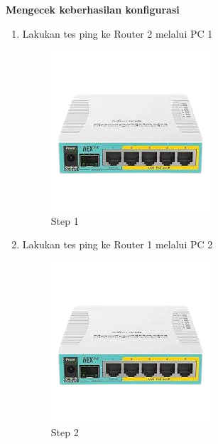 \begin{center} 
	\textbf{Mengecek keberhasilan konfigurasi}
\end{center}

\begin{enumerate}
	\item Lakukan tes ping ke Router 2 melalui PC 1
	\begin{figure}[H]
		\centering
		\includegraphics[width=0.5\linewidth]{P1/img/contoh.png}
		\caption{Step 1}
		\label{fig:gambar8}
	\end{figure}

	\item Lakukan tes ping ke Router 1 melalui PC 2
	\begin{figure}[H]
		\centering
		\includegraphics[width=0.5\linewidth]{P1/img/contoh.png}
		\caption{Step 2}
		\label{fig:gambar9}
	\end{figure}

\end{enumerate}

